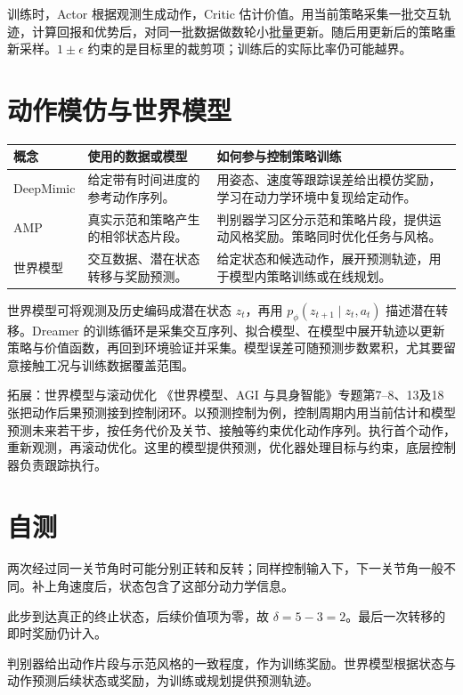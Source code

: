 训练时，Actor 根据观测生成动作，Critic 估计价值。用当前策略采集一批交互轨迹，计算回报和优势后，对同一批数据做数轮小批量更新。随后用更新后的策略重新采样。$1\pm\epsilon$ 约束的是目标里的裁剪项；训练后的实际比率仍可能越界。

\section{动作模仿与世界模型}

\begin{center}
\small
\begin{tabularx}{\linewidth}{@{}p{3.1cm}X X@{}}
\toprule
概念 & 使用的数据或模型 & 如何参与控制策略训练 \\
\midrule
DeepMimic & 给定带有时间进度的参考动作序列。 & 用姿态、速度等跟踪误差给出模仿奖励，学习在动力学环境中复现给定动作。 \\
AMP & 真实示范和策略产生的相邻状态片段。 & 判别器学习区分示范和策略片段，提供运动风格奖励。策略同时优化任务与风格。 \\
世界模型 & 交互数据、潜在状态转移与奖励预测。 & 给定状态和候选动作，展开预测轨迹，用于模型内策略训练或在线规划。 \\
\bottomrule
\end{tabularx}
\end{center}

世界模型可将观测及历史编码成潜在状态 $z_t$，再用 $p_\phi(z_{t+1}\mid z_t,a_t)$ 描述潜在转移。Dreamer 的训练循环是采集交互序列、拟合模型、在模型中展开轨迹以更新策略与价值函数，再回到环境验证并采集。模型误差可随预测步数累积，尤其要留意接触工况与训练数据覆盖范围。

\begin{focusbox}{拓展：世界模型与滚动优化}
《世界模型、AGI 与具身智能》专题第7--8、13及18张把动作后果预测接到控制闭环。以预测控制为例，控制周期内用当前估计和模型预测未来若干步，按任务代价及关节、接触等约束优化动作序列。执行首个动作，重新观测，再滚动优化。这里的模型提供预测，优化器处理目标与约束，底层控制器负责跟踪执行。
\end{focusbox}

\section{自测}

\sol 两次经过同一关节角时可能分别正转和反转；同样控制输入下，下一关节角一般不同。补上角速度后，状态包含了这部分动力学信息。

\sol 此步到达真正的终止状态，后续价值项为零，故 $\delta=5-3=2$。最后一次转移的即时奖励仍计入。

\sol 判别器给出动作片段与示范风格的一致程度，作为训练奖励。世界模型根据状态与动作预测后续状态或奖励，为训练或规划提供预测轨迹。
